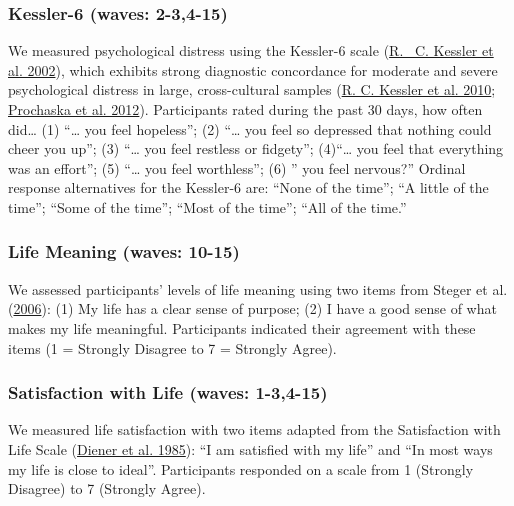 \documentclass[
  singlecolumn]{report}
\begin{document}
\hypertarget{kessler-6-waves-2-34-15}{%
\subsubsection{Kessler-6 (waves:
2-3,4-15)}\label{kessler-6-waves-2-34-15}}

We measured psychological distress using the Kessler-6 scale
(\protect\hyperlink{ref-kessler2002}{R. ~C. Kessler et al. 2002}), which
exhibits strong diagnostic concordance for moderate and severe
psychological distress in large, cross-cultural samples
(\protect\hyperlink{ref-kessler2010}{R. C. Kessler et al. 2010};
\protect\hyperlink{ref-prochaska2012}{Prochaska et al. 2012}).
Participants rated during the past 30 days, how often did\ldots{} (1)
``\ldots{} you feel hopeless''; (2) ``\ldots{} you feel so depressed
that nothing could cheer you up''; (3) ``\ldots{} you feel restless or
fidgety''; (4)``\ldots{} you feel that everything was an effort''; (5)
``\ldots{} you feel worthless''; (6) '' you feel nervous?'' Ordinal
response alternatives for the Kessler-6 are: ``None of the time''; ``A
little of the time''; ``Some of the time''; ``Most of the time''; ``All
of the time.''

\hypertarget{life-meaning-waves-10-15}{%
\subsubsection{Life Meaning (waves:
10-15)}\label{life-meaning-waves-10-15}}

We assessed participants' levels of life meaning using two items from
Steger et al. (\protect\hyperlink{ref-steger_meaning_2006}{2006}): (1)
My life has a clear sense of purpose; (2) I have a good sense of what
makes my life meaningful. Participants indicated their agreement with
these items (1 = Strongly Disagree to 7 = Strongly Agree).

\hypertarget{satisfaction-with-life-waves-1-34-15}{%
\subsubsection{Satisfaction with Life (waves:
1-3,4-15)}\label{satisfaction-with-life-waves-1-34-15}}

We measured life satisfaction with two items adapted from the
Satisfaction with Life Scale (\protect\hyperlink{ref-diener1985}{Diener
et al. 1985}): ``I am satisfied with my life'' and ``In most ways my
life is close to ideal''. Participants responded on a scale from 1
(Strongly Disagree) to 7 (Strongly Agree).
\end{document}
